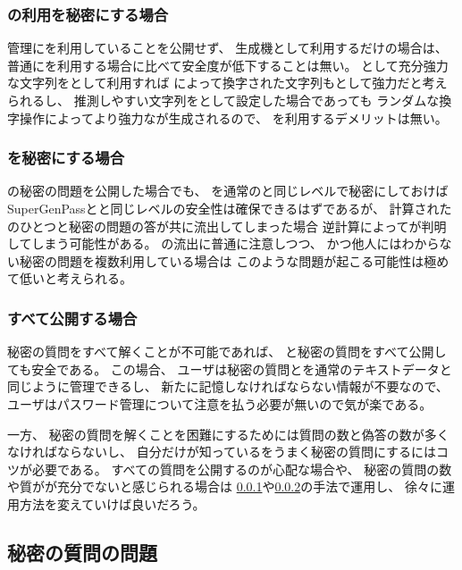 \documentclass[twoside]{wiss}
\begin{document}
\subsubsection{\protect{\textsf{\EP}}の利用を秘密にする場合}
\label{pattern1}

{\PW}管理に{\EP}を利用していることを公開せず、
{\PW}生成機として利用するだけの場合は、
普通に{\PW}を利用する場合に比べて安全度が低下することは無い。
{\PW}として充分強力な文字列を{\SS}として利用すれば
{\EP}によって換字された文字列も{\PW}として強力だと考えられるし、
推測しやすい文字列を{\SS}として設定した場合であっても
ランダムな換字操作によってより強力な{\PW}が生成されるので、
{\EP}を利用するデメリットは無い。

\subsubsection{{\SS}を秘密にする場合}
\label{pattern2}

{\EP}の秘密の問題を公開した場合でも、
{\SS}を通常の{\PW}と同じレベルで秘密にしておけば
SuperGenPassと\cite{SuperGenPass}と同じレベルの安全性は確保できるはずであるが、
計算された{\PW}のひとつと秘密の問題の答が共に流出してしまった場合
逆計算によって{\SS}が判明してしまう可能性がある。
{\PW}の流出に普通に注意しつつ、
かつ他人にはわからない秘密の問題を複数利用している場合は
このような問題が起こる可能性は極めて低いと考えられる。


\subsubsection{すべて公開する場合}

秘密の質問をすべて解くことが不可能であれば、
{\SS}と秘密の質問をすべて公開しても安全である。
この場合、
ユーザは秘密の質問と{\SS}を通常のテキストデータと同じように管理できるし、
新たに記憶しなければならない情報が不要なので、
ユーザはパスワード管理について注意を払う必要が無いので気が楽である。

一方、
秘密の質問を解くことを困難にするためには質問の数と偽答の数が多くなければならないし、
自分だけが知っている{\EM}をうまく秘密の質問にするにはコツが必要である。
すべての質問を公開するのが心配な場合や、
秘密の質問の数や質がが充分でないと感じられる場合は
\ref{pattern1}や\ref{pattern2}の手法で運用し、
徐々に運用方法を変えていけば良いだろう。

\subsection{秘密の質問の問題}
\end{document}
